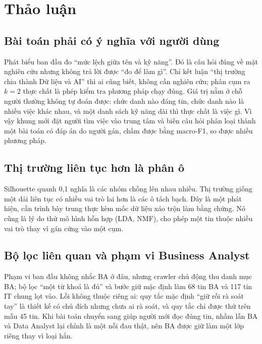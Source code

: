 \documentclass[12pt]{article}
\begin{document}
\newpage
\section{Thảo luận}
\subsection{Bài toán phải có ý nghĩa với người dùng}

Phát biểu ban đầu đo ``mức lệch giữa tên và kỹ năng''. Đó là câu hỏi đúng về mặt nghiên cứu nhưng không trả lời được ``đo để làm gì''. Chỉ kết luận ``thị trường chia thành Dữ liệu và AI'' thì ai cũng biết, không cần nghiên cứu; phân cụm ra $k = 2$ thực chất là phép kiểm tra phương pháp chạy đúng. Giá trị nằm ở chỗ người thường không tự đoán được: chức danh nào đáng tin, chức danh nào là nhiều việc khác nhau, và một danh sách kỹ năng dài thì thực chất là việc gì. Vì vậy khung mới đặt người tìm việc vào trung tâm và biến câu hỏi phân loại thành một bài toán có đáp án do người gán, chấm được bằng macro-F1, so được nhiều phương pháp.

\subsection{Thị trường liên tục hơn là phân ô}

Silhouette quanh 0,1 nghĩa là các nhóm chồng lên nhau nhiều. Thị trường giống một dải liên tục có nhiều vai trò lai hơn là các ô tách bạch. Đây là một phát hiện, cần trình bày trung thực kèm mốc dữ liệu xáo trộn làm bằng chứng. Nó cũng là lý do thử mô hình hỗn hợp (LDA, NMF), cho phép một tin thuộc nhiều vai trò thay vì gán cứng vào một cụm.

\subsection{Bộ lọc liên quan và phạm vi Business Analyst}

Phạm vi ban đầu không nhắc BA ở đâu, nhưng crawler chủ động thu danh mục BA; bộ lọc ``một từ khoá là đủ'' và bước giữ mặc định làm 68 tin BA và 117 tin IT chung lọt vào. Lỗi không thuộc riêng ai: quy tắc mặc định ``giữ rồi rà soát tay'' là thiết kế có chủ đích nhưng chưa ai rà soát, và quy tắc chỉ được thử trên mẫu 45 tin. Khi bài toán chuyển sang giúp người mới đọc đúng tin, nhầm lẫn BA và Data Analyst lại chính là một nỗi đau thật, nên BA được giữ làm một lớp riêng thay vì loại hẳn.
\end{document}
